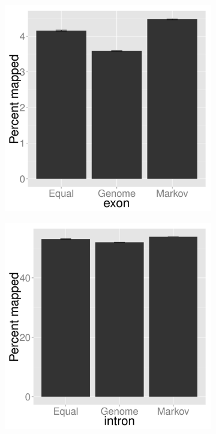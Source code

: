\documentclass{article}
\begin{document}
\begin{figure}[t]
   \centering
   \begin{subfigure}{.33\columnwidth}
      \centering
      \includegraphics[width=.9\textwidth,natwidth=100,natheight=100]{22mer_exon.pdf}
      \caption{}
      \label{fig:22mer_exon}
   \end{subfigure}%
   \begin{subfigure}{.33\columnwidth}
      \centering
      \includegraphics[width=.9\textwidth,natwidth=100,natheight=100]{22mer_intron.pdf}

\end{subfigure}
\end{figure}
\end{document}
